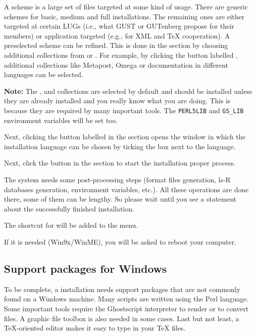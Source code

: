 \documentclass{article}
\begin{document}
A scheme is a large set of files targeted at some kind of usage. There are 
generic schemes for basic, medium and full installations. The remaining ones
are either targeted  at certain LUGs (i.e., what GUST or GUTenberg propose
for their members) or application targeted (e.g., for XML and \TeX{}
cooperation).  A preselected scheme can be refined. This is done in the 
 section by choosing additional collections from 
 or . For example, 
by clicking the  button labelled , additional collections like Metapost, Omega or documentation 
in different languages can be selected.

\textbf{Note:} The ,  and 
collections are selected by default and should be installed unless they are
already installed and you really know what you are doing. This is because
they are required by many important tools. The \verb|PERL5LIB| and
\verb|GS_LIB| environment variables will be set too.

Next, clicking the  button labelled  in the  section opens the
 window in which the installation language can
be chosen by ticking the box next to the language.

Next, click the  button in the  section to 
start the installation proper process.

The \TL{} system  needs some post-processing  steps (format files
generation,  ls-R  databases generation, environment variables, etc.). All
these operations are done there, some of them can be lengthy. So please wait
until you see a statement about the successfully finished installation.

The shortcut for  will be added to the
 menu.

If it is needed (Win9x/WinME), you will be asked to reboot your computer.

\subsection{Support packages for Windows}
\label{sec:win-xemtex}

To be complete, a \TL installation needs support packages that are not
commonly found on a Windows machine.  Many scripts are written using the Perl
language. Some important tools require the Ghostscript \PS{} interpreter to
render or to convert files. A graphic file toolbox is also needed in some
cases. Last but not least, a \TeX-oriented editor makes it easy to type in
your \TeX{} files.
\end{document}

